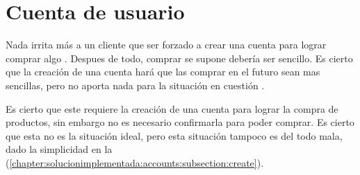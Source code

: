 \section{Cuenta de usuario}\label{chapter:solucionimplementada:section:account}

	Nada irrita más a un cliente que ser forzado a crear una cuenta para lograr comprar algo \online. Despues de todo, comprar \online se supone debería ser sencillo. Es cierto que la creación de una cuenta hará que las comprar en el futuro sean mas sencillas, pero no aporta nada para la situación en cuestión \cite{online_official_imediaconnection_best_practices_shopping_cart}.

	Es cierto que este \frameworkPC requiere la creación de una cuenta para lograr la compra de productos, sin embargo no es necesario confirmarla para poder comprar. Es cierto que esta no es la situación ideal, pero esta situación tampoco es del todo mala, dado la simplicidad en la  (\ref{chapter:solucionimplementada:accounts:subsection:create}). 
